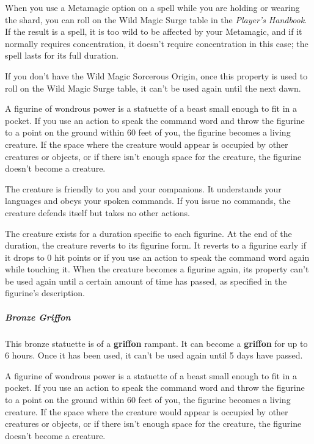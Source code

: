 \documentclass[10pt,a4paper,twoside,bg=print,twocolumn,openany,nodeprecatedcode]{dndbook}
\begin{document}
When you use a Metamagic option on a spell while you are holding or wearing the shard, you can roll on the Wild Magic Surge table in the \textit{Player's Handbook}. If the result is a spell, it is too wild to be affected by your Metamagic, and if it normally requires concentration, it doesn't require concentration in this case; the spell lasts for its full duration.

If you don't have the Wild Magic Sorcerous Origin, once this property is used to roll on the Wild Magic Surge table, it can't be used again until the next dawn.

A figurine of wondrous power is a statuette of a beast small enough to fit in a pocket. If you use an action to speak the command word and throw the figurine to a point on the ground within 60 feet of you, the figurine becomes a living creature. If the space where the creature would appear is occupied by other creatures or objects, or if there isn't enough space for the creature, the figurine doesn't become a creature.

The creature is friendly to you and your companions. It understands your languages and obeys your spoken commands. If you issue no commands, the creature defends itself but takes no other actions.

The creature exists for a duration specific to each figurine. At the end of the duration, the creature reverts to its figurine form. It reverts to a figurine early if it drops to 0 hit points or if you use an action to speak the command word again while touching it. When the creature becomes a figurine again, its property can't be used again until a certain amount of time has passed, as specified in the figurine's description.

\subparagraph{Bronze Griffon}
This bronze statuette is of a \textbf{griffon} rampant. It can become a \textbf{griffon} for up to 6 hours. Once it has been used, it can't be used again until 5 days have passed.

A figurine of wondrous power is a statuette of a beast small enough to fit in a pocket. If you use an action to speak the command word and throw the figurine to a point on the ground within 60 feet of you, the figurine becomes a living creature. If the space where the creature would appear is occupied by other creatures or objects, or if there isn't enough space for the creature, the figurine doesn't become a creature.
\end{document}
